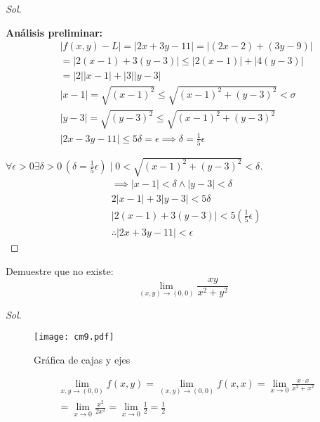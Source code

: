 \textit{ Sol. }

\textbf{Análisis preliminar: }
\begin{align*}
	 & \left\lvert f(x,y)-L\right\rvert =\left\lvert 2x+3y-11\right\rvert=\left\lvert (2x-2)+(3y-9)\right\rvert      \\
	 & =\left\lvert 2(x-1)+3(y-3)\right\rvert \leq \left\lvert 2(x-1)\right\rvert +\left\lvert 4(y-3)\right\rvert    \\
	 & =\left\lvert 2\right\rvert \left\lvert x-1\right\rvert +\left\lvert 3\right\rvert \left\lvert y-3\right\rvert \\
	 & \left\lvert x-1\right\rvert =\sqrt{(x-1)^2}\leq \sqrt{(x-1)^2+(y-3)^2}<\sigma                                 \\
	 & \left\lvert y-3\right\rvert =\sqrt{(y-3)^2}\leq \sqrt{(x-1)^2+(y-3)^2}                                        \\
	 & \left\lvert 2x-3y-11\right\rvert \leq 5\delta=\epsilon\implies \delta=\frac{1}{5}\epsilon
\end{align*}
\begin{proof}[$\forall \epsilon>0\exists\delta>0\, \left(\delta=\frac{1}{5}\epsilon\right)\mid 0<\sqrt{(x-1)^2+(y-3)^2}<\delta$]
	\begin{align*}
		 & \implies \left\lvert x-1\right\rvert <\delta \land \left\lvert y-3\right\rvert <\delta \\
		 & 2\left\lvert x-1\right\rvert +3\left\lvert y-3\right\rvert <5\delta                    \\
		 & \left\lvert 2(x-1)+3(y-3)\right\rvert <5\left(\frac{1}{5}\epsilon \right)              \\
		 & \therefore \left\lvert 2x+3y-11\right\rvert<\epsilon
	\end{align*}
\end{proof}

\begin{example}
	Demuestre que no existe:
	\begin{equation*}
		\lim_{(x,y)\to (0,0)}\frac{xy}{x^2+y^2}
	\end{equation*}
\end{example}

\textit{ Sol. }

\begin{figure}[h!]
	\centering
	\texttt{[image: cm9.pdf]}
	\caption{Gráfica de cajas y ejes}
\end{figure}


\begin{align*}
	 & \lim_{x,y\to (0,0)}f(x,y)=\lim_{(x,y)\to (0,0)}f(x,x)=\lim_{x\to 0}\frac{x\cdot x}{x^2+x^2} \\
	 & =\lim_{x\to 0}\frac{x^2}{2x^2}=\lim_{x\to 0}\frac{1}{2}=\frac{1}{2}
\end{align*}

